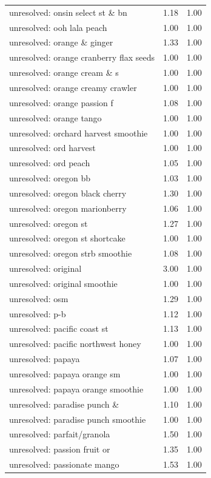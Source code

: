 \begin{table}
\begin{tabular}{lrr}
unresolved: onsin select st \& bn & 1.18 & 1.00 \\
unresolved: ooh lala peach & 1.00 & 1.00 \\
unresolved: orange \& ginger & 1.33 & 1.00 \\
unresolved: orange cranberry flax seeds & 1.00 & 1.00 \\
unresolved: orange cream \& s & 1.00 & 1.00 \\
unresolved: orange creamy crawler & 1.00 & 1.00 \\
unresolved: orange passion f & 1.08 & 1.00 \\
unresolved: orange tango & 1.00 & 1.00 \\
unresolved: orchard harvest smoothie & 1.00 & 1.00 \\
unresolved: ord harvest & 1.00 & 1.00 \\
unresolved: ord peach & 1.05 & 1.00 \\
unresolved: oregon bb & 1.03 & 1.00 \\
unresolved: oregon black cherry & 1.30 & 1.00 \\
unresolved: oregon marionberry & 1.06 & 1.00 \\
unresolved: oregon st & 1.27 & 1.00 \\
unresolved: oregon st shortcake & 1.00 & 1.00 \\
unresolved: oregon strb smoothie & 1.08 & 1.00 \\
unresolved: original & 3.00 & 1.00 \\
unresolved: original smoothie & 1.00 & 1.00 \\
unresolved: osm & 1.29 & 1.00 \\
unresolved: p-b & 1.12 & 1.00 \\
unresolved: pacific coast st & 1.13 & 1.00 \\
unresolved: pacific northwest honey & 1.00 & 1.00 \\
unresolved: papaya & 1.07 & 1.00 \\
unresolved: papaya orange sm & 1.00 & 1.00 \\
unresolved: papaya orange smoothie & 1.00 & 1.00 \\
unresolved: paradise punch \& & 1.10 & 1.00 \\
unresolved: paradise punch smoothie & 1.00 & 1.00 \\
unresolved: parfait/granola & 1.50 & 1.00 \\
unresolved: passion fruit or & 1.35 & 1.00 \\
unresolved: passionate mango & 1.53 & 1.00 \\

\end{tabular}
\end{table}
